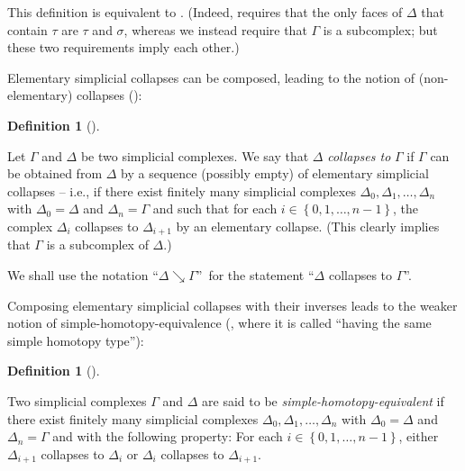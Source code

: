 \documentclass[numbers=enddot,12pt,final,onecolumn,notitlepage]{scrartcl}%
\theoremstyle{definition}
\newtheorem{defi}[theo]{Definition}
\newenvironment{definition}[1][]
{\begin{defi}[#1]\begin{leftbar}}
{\end{leftbar}\end{defi}}
\newcommand{\set}[1]{\left\{ #1 \right\}}
\begin{document}
This definition is equivalent to \cite[Definition 9.1]{Kozlov20}.
(Indeed, \cite[Definition 9.1]{Kozlov20} requires that the
only faces of $\Delta$ that contain $\tau$ are $\tau$ and $\sigma$,
whereas we instead require that $\Gamma$ is a subcomplex;
but these two requirements imply each other.)

Elementary simplicial collapses can be composed, leading to
the notion of (non-elementary) collapses
(\cite[Definition 9.4]{Kozlov20}):

\begin{definition}
  \label{def.simple.homotopy.collapse}
  Let $\Gamma$ and $\Delta$ be two simplicial complexes.
  We say that $\Delta$ \emph{collapses to} $\Gamma$
  if $\Gamma$ can be obtained from $\Delta$ by a sequence
  (possibly empty) of elementary simplicial collapses
  -- i.e., if there exist finitely many simplicial complexes $\Delta_0, \Delta_1, \dots, \Delta_n$
  with $\Delta_0 = \Delta$ and $\Delta_n = \Gamma$ and such that
  for each $i \in \set{0, 1, \dots, n-1}$,
  the complex $\Delta_i$ collapses to $\Delta_{i+1}$ by an
  elementary collapse.
  (This clearly implies that $\Gamma$ is a subcomplex of
  $\Delta$.)
  
  We shall use the notation ``$\Delta\searrow\Gamma$''\ for
  the statement ``$\Delta$ collapses to
  $\Gamma$''.
\end{definition}

Composing elementary simplicial collapses with
their inverses leads to the weaker notion of
simple-homotopy-equivalence
(\cite[Definition 9.26]{Kozlov20}, where it is called
``having the same simple homotopy type''):

\begin{definition}
  \label{def.simple.homotopy.equivalence}

  Two simplicial complexes $\Gamma$ and $\Delta$ are said to be \emph{simple-homotopy-equivalent} if
  there exist finitely many simplicial complexes $\Delta_0, \Delta_1, \dots, \Delta_n$
  with $\Delta_0 = \Delta$ and $\Delta_n = \Gamma$ and with the following property:
  For each $i \in \set{0, 1, \dots, n-1}$,
  either $\Delta_{i+1}$ collapses to $\Delta_i$ or $\Delta_i$ collapses to $\Delta_{i+1}$.
\end{definition}
\end{document}
